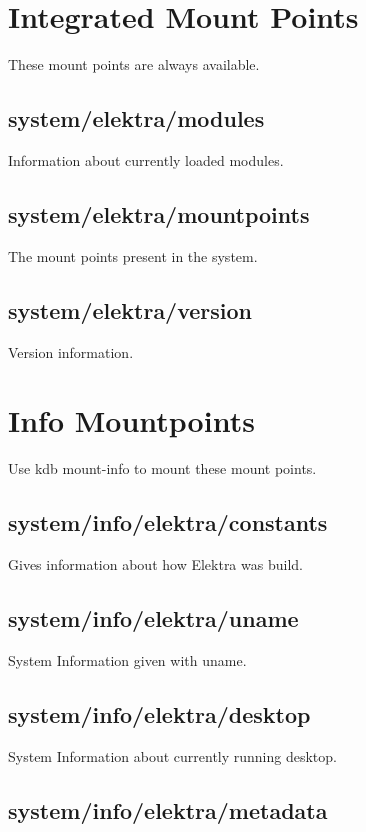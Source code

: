 \section*{Integrated Mount Points}

These mount points are always available.

\subsection*{system/elektra/modules}

Information about currently loaded modules.

\subsection*{system/elektra/mountpoints}

The mount points present in the system.

\subsection*{system/elektra/version}

Version information.

\section*{Info Mountpoints}

Use {\ttfamily kdb mount-\/info} to mount these mount points.

\subsection*{system/info/elektra/constants}

Gives information about how Elektra was build.

\subsection*{system/info/elektra/uname}

System Information given with {\ttfamily uname}.

\subsection*{system/info/elektra/desktop}

System Information about currently running desktop.

\subsection*{system/info/elektra/metadata}

